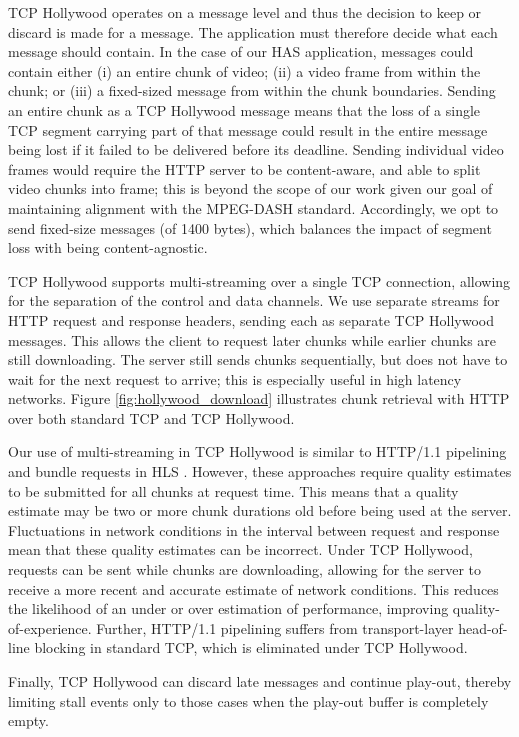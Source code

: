 TCP Hollywood operates on a message level and thus the decision to keep or discard is made
for a message. The application must therefore decide what each message should contain. In
the case of our HAS application, messages could contain either (i) an entire chunk of video; 
(ii) a video frame from within the chunk; or (iii) a fixed-sized message from within the 
chunk boundaries.  Sending an entire chunk as a TCP Hollywood
message means that the loss of a single TCP segment carrying part of that message could result in
the entire message being lost if it failed to be delivered before its deadline. Sending 
individual video frames would require the HTTP server to be content-aware, and able to 
split video chunks into frame; this is beyond the scope of our work given our goal of
maintaining alignment with the MPEG-DASH standard. Accordingly, we opt to send fixed-size 
messages (of 1400 bytes), which balances the impact of segment loss with being content-agnostic. 

TCP Hollywood supports multi-streaming over a single TCP connection, allowing for the
separation of the control and data channels. We use separate streams for HTTP request and
response headers, sending each as separate TCP Hollywood messages. This allows the client
to request later chunks while earlier chunks are still downloading. The server still sends
chunks sequentially, but does not have to wait for the next request to arrive; this is
especially useful in high latency networks. Figure \ref{fig:hollywood_download}
illustrates chunk retrieval with HTTP over both standard TCP and TCP Hollywood.

Our use of multi-streaming in TCP Hollywood is similar to HTTP/1.1 pipelining and bundle
requests in HLS \cite{muller2012evaluation}. However, these approaches require quality
estimates to be submitted for all chunks at request time. This means that a quality
estimate may be two or more chunk durations old before being used at the server.
Fluctuations in network conditions in the interval between request and response mean that
these quality estimates can be incorrect. Under TCP Hollywood, requests can be sent while
chunks are downloading, allowing for the server to receive a more recent and accurate
estimate of network conditions. This reduces the likelihood of an under or over estimation
of performance, improving quality-of-experience. Further, HTTP/1.1 pipelining suffers
from transport-layer head-of-line blocking in standard TCP, which is eliminated under TCP Hollywood.

Finally, TCP Hollywood can discard late messages and continue play-out,
thereby limiting stall events only to those cases when the play-out buffer is completely
empty.

